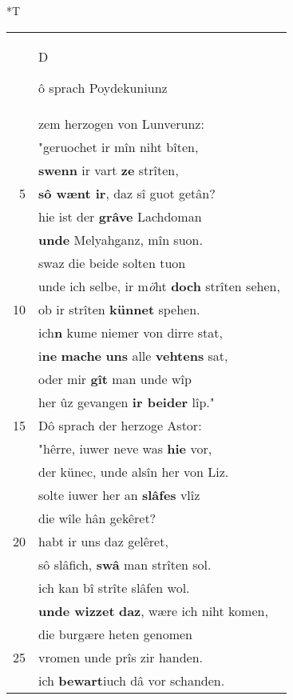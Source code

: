\documentclass[8pt,a4paper,notitlepage]{article}
\begin{document}
\begin{table}[ht]
\begin{minipage}[t]{0.5\linewidth}
\end{minipage}
\hspace{0.5cm}
\begin{minipage}[t]{0.5\linewidth}
\small
\begin{center}*T
\end{center}
\begin{tabular}{rl}
 & \begin{large}D\end{large}ô sprach Poydekuniunz\\ 
 & zem herzogen von Lunverunz:\\ 
 & "geruochet ir mîn niht bîten,\\ 
 & \textbf{swenn} ir vart \textbf{ze} strîten,\\ 
5 & \textbf{sô wænt ir}, daz sî guot getân?\\ 
 & hie ist der \textbf{grâve} Lachdoman\\ 
 & \textbf{unde} Melyahganz, mîn suon.\\ 
 & swaz die beide solten tuon\\ 
 & unde ich selbe, ir m\textit{ö}ht \textbf{doch} strîten sehen,\\ 
10 & ob ir strîten \textbf{künnet} spehen.\\ 
 & ich\textbf{n} kume niemer von dirre stat,\\ 
 & i\textbf{ne} \textbf{mache} \textbf{uns} alle \textbf{vehtens} sat,\\ 
 & oder mir \textbf{gît} man unde wîp\\ 
 & her ûz gevangen \textbf{ir beider} lîp."\\ 
15 & Dô sprach der herzoge Astor:\\ 
 & "hêrre, iuwer neve was \textbf{hie} vor,\\ 
 & der künec, unde alsîn her von Liz.\\ 
 & solte iuwer her an \textbf{slâfes} vlîz\\ 
 & die wîle hân gekêret?\\ 
20 & habt ir uns daz gelêret,\\ 
 & sô slâfich, \textbf{swâ} man strîten sol.\\ 
 & ich kan bî strîte slâfen wol.\\ 
 & \textbf{unde wizzet} \textbf{daz}, wære ich niht komen,\\ 
 & die burgære heten genomen\\ 
25 & vromen unde prîs zir handen.\\ 
 & ich \textbf{bewart}iuch dâ vor schanden.\\ 

\end{tabular}
\end{minipage}
\end{table}
\end{document}
